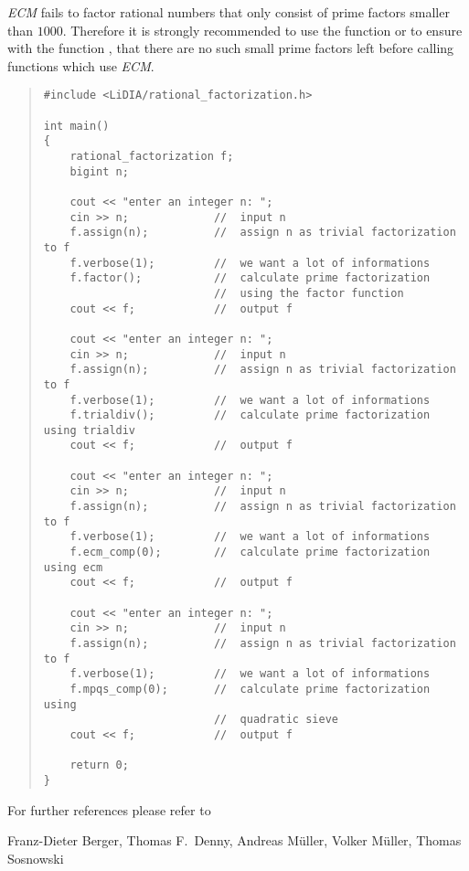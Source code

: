 
\WARNINGS

\emph{ECM} fails to factor rational numbers that only consist of prime factors smaller than
$1000$.  Therefore it is strongly recommended to use the function  or to ensure
with the function , that there are no such small prime factors left before
calling functions which use \emph{ECM}.



\EXAMPLES

\begin{quote}
\begin{verbatim}
#include <LiDIA/rational_factorization.h>

int main()
{
    rational_factorization f;
    bigint n;

    cout << "enter an integer n: ";
    cin >> n;             //  input n
    f.assign(n);          //  assign n as trivial factorization to f
    f.verbose(1);         //  we want a lot of informations
    f.factor();           //  calculate prime factorization
                          //  using the factor function
    cout << f;            //  output f

    cout << "enter an integer n: ";
    cin >> n;             //  input n
    f.assign(n);          //  assign n as trivial factorization to f
    f.verbose(1);         //  we want a lot of informations
    f.trialdiv();         //  calculate prime factorization using trialdiv
    cout << f;            //  output f

    cout << "enter an integer n: ";
    cin >> n;             //  input n
    f.assign(n);          //  assign n as trivial factorization to f
    f.verbose(1);         //  we want a lot of informations
    f.ecm_comp(0);        //  calculate prime factorization using ecm
    cout << f;            //  output f

    cout << "enter an integer n: ";
    cin >> n;             //  input n
    f.assign(n);          //  assign n as trivial factorization to f
    f.verbose(1);         //  we want a lot of informations
    f.mpqs_comp(0);       //  calculate prime factorization using
                          //  quadratic sieve
    cout << f;            //  output f

    return 0;
}
\end{verbatim}
\end{quote}

For further references please refer to



\AUTHOR

Franz-Dieter Berger, Thomas F.~Denny, Andreas M{\"u}ller, Volker M{\"u}ller, Thomas Sosnowski


